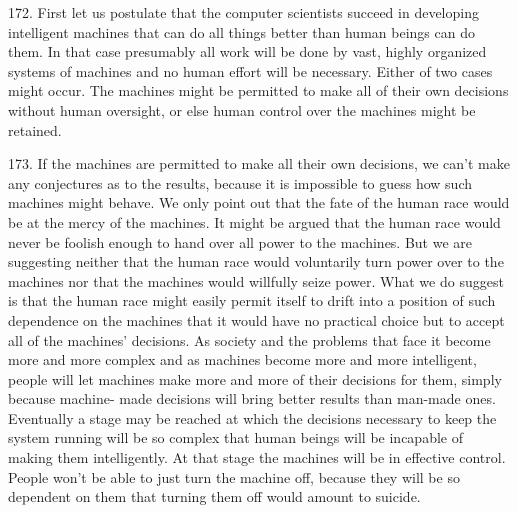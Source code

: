 \documentclass{article}
\begin{document}
172.  First let us postulate that the computer scientists succeed in developing intelligent machines 
that can do all things better than human beings can do them.  In that case presumably all work will 
be done by vast, highly organized systems of machines and no human effort will be 
necessary.  Either of two cases might occur.  The machines might be permitted to make all of their 
own  decisions  without  human  oversight,  or  else  human  control  over  the  machines  might  be  
retained. \vspace{\baselineskip}

173.  If the machines are permitted to make all their own decisions, we can’t make any conjectures 
as  to  the  results,  because  it  is  impossible  to  guess  how  such  machines  might  behave.   We  only  
point out that the fate of the human race would be at the mercy of the machines.  It might be argued 
that the human race would never be foolish enough to hand over all power to the machines.  But 
we are suggesting neither that the human race would voluntarily turn power over to the machines 
nor that the machines would willfully seize power.  What we do suggest  is that the human race 
might easily permit itself to drift into a position of such dependence on the machines that it would 
have no practical choice but to accept all of the machines’ decisions.  As society and the problems 
that face it become more and more complex and as machines become more and more intelligent, 
people will let machines make more and more of their decisions for them, simply because machine-
made decisions will bring better results than man-made ones.  Eventually a stage may be reached 
at which the decisions necessary to keep the system running will be so complex that human beings 
will  be  incapable  of  making  them  intelligently.   At  that  stage  the  machines  will  be  in  effective  
control.  People won’t be able to just turn the machine off, because they will be so dependent on 
them that turning them off would amount to suicide. \vspace{\baselineskip}
\end{document}
